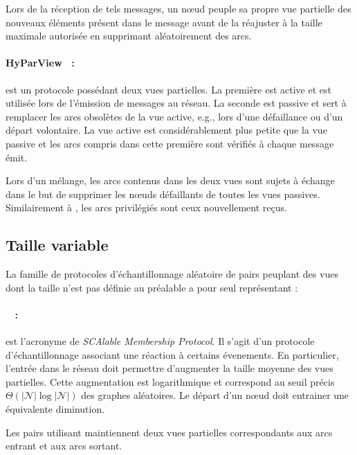 \noindent Lors de la réception de tels messages, un nœud peuple sa propre vue
partielle des nouveaux éléments présent dans le message avant de la réajuster à
la taille maximale autorisée en supprimant aléatoirement des arcs.

\paragraph{HyParView~\cite{leitao2007dependable} :} est un protocole possédant
deux vues partielles. La première est active et est utilisée lors de l'émission
de messages au réseau. La seconde est passive et sert à remplacer les arcs
obsolètes de la vue active, e.g., lors d'une défaillance ou d'un départ
volontaire.  La vue active est considérablement plus petite que la vue passive
et les arcs compris dans cette première sont vérifiés à chaque message émit.

\noindent Lors d'un mélange, les arcs contenus dans les deux vues sont sujets à
échange dans le but de supprimer les nœuds défaillants de toutes les vues
passives. Similairement à \CYCLON, les arcs privilégiés sont ceux nouvellement
reçus.


\subsection{Taille variable}
\label{net:subsec:variable}

La famille de protocoles d'échantillonnage aléatoire de pairs peuplant des vues
dont la taille n'est pas définie au préalable a pour seul représentant :

\paragraph{\SCAMP~\cite{ganesh2001scamp, ganesh2003peer} :} est l'acronyme de
\emph{SCAlable Membership Protocol}. Il s'agit d'un protocole d'échantillonnage
associant une réaction à certains évenements. En particulier, l'entrée dans le
réseau doit permettre d'augmenter la taille moyenne des vues partielles. Cette
augmentation est logarithmique et correspond au seuil précis
$\Theta (|\mathcal{N}|\log |\mathcal{N}|)$ des graphes aléatoires. Le départ
d'un nœud doit entrainer une équivalente diminution.

\noindent Les pairs utilisant \SCAMP maintiennent deux vues partielles
correspondants aux arcs entrant et aux arcs sortant.


